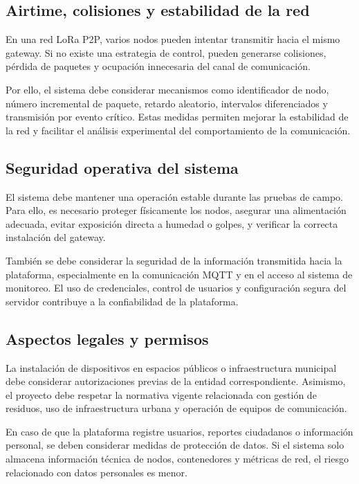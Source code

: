\subsection{Airtime, colisiones y estabilidad de la red}

En una red LoRa P2P, varios nodos pueden intentar transmitir hacia el mismo gateway. Si no existe una estrategia de control, pueden generarse colisiones, pérdida de paquetes y ocupación innecesaria del canal de comunicación.

Por ello, el sistema debe considerar mecanismos como identificador de nodo, número incremental de paquete, retardo aleatorio, intervalos diferenciados y transmisión por evento crítico. Estas medidas permiten mejorar la estabilidad de la red y facilitar el análisis experimental del comportamiento de la comunicación.

\subsection{Seguridad operativa del sistema}

El sistema debe mantener una operación estable durante las pruebas de campo. Para ello, es necesario proteger físicamente los nodos, asegurar una alimentación adecuada, evitar exposición directa a humedad o golpes, y verificar la correcta instalación del gateway.

También se debe considerar la seguridad de la información transmitida hacia la plataforma, especialmente en la comunicación MQTT y en el acceso al sistema de monitoreo. El uso de credenciales, control de usuarios y configuración segura del servidor contribuye a la confiabilidad de la plataforma.

\subsection{Aspectos legales y permisos}

La instalación de dispositivos en espacios públicos o infraestructura municipal debe considerar autorizaciones previas de la entidad correspondiente. Asimismo, el proyecto debe respetar la normativa vigente relacionada con gestión de residuos, uso de infraestructura urbana y operación de equipos de comunicación.

En caso de que la plataforma registre usuarios, reportes ciudadanos o información personal, se deben considerar medidas de protección de datos. Si el sistema solo almacena información técnica de nodos, contenedores y métricas de red, el riesgo relacionado con datos personales es menor.

